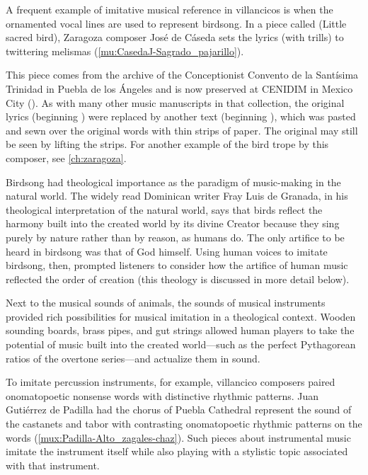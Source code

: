 A frequent example of imitative musical reference in villancicos is when the ornamented vocal lines are used to represent birdsong.
In a piece called  (Little sacred bird), Zaragoza
composer José de Cáseda sets the lyrics  (with trills) to
twittering melismas (\cref{mu:CasedaJ-Sagrado_pajarillo}).%
\begin{Footnote} 
    This piece comes from the archive of the Conceptionist Convento de la
    Santísima Trinidad in Puebla de los Ángeles and is now preserved at CENIDIM
    in Mexico City ().
    As with many other music manuscripts in that collection, the original
    lyrics (beginning ) were replaced by another
    text (beginning ), which was pasted and sewn
    over the original words with thin strips of paper.  
    The original may still be seen by lifting the strips.
    For another example of the bird trope by this composer, see
    \cref{ch:zaragoza}.
\end{Footnote}
Birdsong had theological importance as the paradigm of music-making in the
natural world.
The widely read Dominican writer Fray Luis de Granada, in his theological
interpretation of the natural world, says that birds reflect the harmony built
into the created world by its divine Creator because they sing purely by nature
rather than by reason, as humans do.%
    \citXXX[luis]
The only artifice to be heard in birdsong was that of God himself.
Using human voices to imitate birdsong, then, prompted listeners to consider
how the artifice of human music reflected the order of creation (this theology
is discussed in more detail below). 


Next to the musical sounds of animals, the sounds of musical instruments
provided rich possibilities for musical imitation in a theological context.
Wooden sounding boards, brass pipes, and gut strings allowed human players to
take the potential of music built into the created world---such as the perfect
Pythagorean ratios of the overtone series---and actualize them in sound.

To imitate percussion instruments, for example, villancico composers paired
onomatopoetic nonsense words with distinctive rhythmic patterns.
Juan Gutiérrez de Padilla had the chorus of Puebla Cathedral represent the
sound of the castanets and tabor with contrasting onomatopoetic rhythmic
patterns on the words  (\cref{mux:Padilla-Alto_zagales-chaz}).
Such pieces about instrumental music imitate the instrument itself while also
playing with a stylistic topic associated with that instrument.

